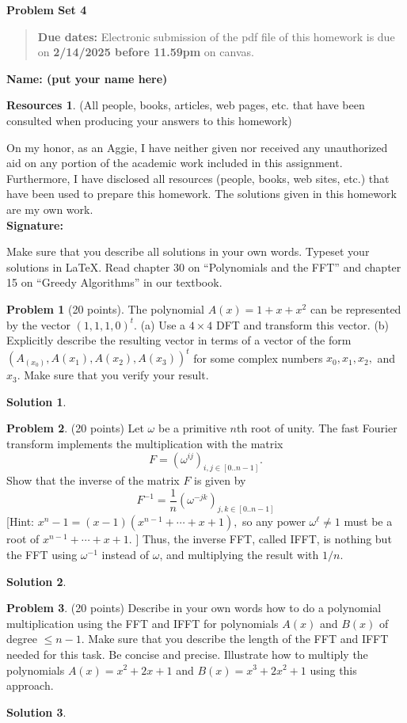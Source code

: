 \documentclass{article}
\theoremstyle{definition}
\newtheorem{problem}{Problem}
\newtheorem*{solution}{Solution}
\newtheorem*{resources}{Resources}
\newcommand{\name}[1]{\noindent\textbf{Name: #1}}
\newcommand{\honor}{\noindent On my honor, as an Aggie, I have neither
  given nor received any unauthorized aid on any portion of the
  academic work included in this assignment. Furthermore, I have
  disclosed all resources (people, books, web sites, etc.) that have
  been used to prepare this homework. The solutions given in this
  homework are my own work.\\[1ex]
 \textbf{Signature:} \underline{\hspace*{5cm}} }
\newcommand{\problemset}[1]{\begin{center}\textbf{Problem Set
      #1}\end{center}}
\newcommand{\duedate}[2]{\begin{quote}\textbf{Due dates:} Electronic
    submission of the pdf file of this homework is due on
    \textbf{#1} on canvas. \end{quote} }
\begin{document}
\problemset{4}
\duedate{2/14/2025 before 11.59pm}{}
\name{ (put your name here)}
\begin{resources} (All people, books, articles, web pages, etc. that
  have been consulted when producing your answers to this homework)
\end{resources}
\honor

\newpage
Make sure that you describe all solutions in your own words. Typeset
your solutions in \LaTeX. Read
chapter 30 on ``Polynomials and the FFT'' and chapter 15 on ``Greedy
Algorithms'' in our textbook. 

\begin{problem}[20 points]
The polynomial $A(x) = 1+x+x^2$ can be represented by the vector
$(1,1,1,0)^t$. (a) Use a $4\times 4$ DFT and transform this
vector. (b) Explicitly describe the resulting vector in terms of a
vector of the form $(A_(x_0), A(x_1), A(x_2), A(x_3))^t$ for some complex
numbers $x_0, x_1, x_2,$ and $x_3$. Make sure that you verify your
result. 
\end{problem}
\begin{solution}
\end{solution}

\begin{problem} (20 points) Let $\omega$ be a primitive $n$th root of unity. 
The fast Fourier transform implements the multiplication with
  the matrix 
$$ F = (\omega^{ij})_{i,j\in [0..n-1]}.$$
Show that the inverse of the matrix $F$ is given by 
$$ F^{-1} = \frac{1}{n}  (\omega^{-jk})_{j,k\in [0..n-1]}$$
[Hint: $x^n-1= (x-1)(x^{n-1}+\cdots + x + 1),$ so any power
$\omega^\ell\neq 1$  must be a root of $x^{n-1}+\cdots + x + 1$.  ]  
Thus, the inverse FFT, called IFFT, is nothing but the FFT using
$\omega^{-1}$ instead of $\omega$, and multiplying the result with
$1/n$. 
\end{problem}
\begin{solution}
\end{solution}

\begin{problem} (20 points) 
Describe in your own words how to do a polynomial multiplication using the FFT and
  IFFT for polynomials $A(x)$ and $B(x)$ of degree $\le n-1$. Make
  sure that you describe the length of the FFT and IFFT needed for
  this task. Be concise and precise. Illustrate how to multiply the
  polynomials $A(x) = x^2+2x+1$ and $B(x)=x^3+2x^2+1$ using this
  approach. 
\end{problem}
\begin{solution}
\end{solution}
\end{document}
